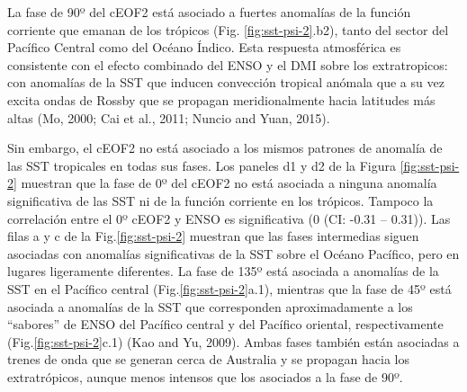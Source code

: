 \documentclass[12pt,oneside]{reedthesis}
\begin{document}
La fase de 90º del cEOF2 está asociado a fuertes anomalías de la función corriente que emanan de los trópicos (Fig. \ref{fig:sst-psi-2}.b2), tanto del sector del Pacífico Central como del Océano Índico.
Esta respuesta atmosférica es consistente con el efecto combinado del ENSO y el DMI sobre los extratropicos: con anomalías de la SST que inducen convección tropical anómala que a su vez excita ondas de Rossby que se propagan meridionalmente hacia latitudes más altas (Mo, 2000; Cai et al., 2011; Nuncio and Yuan, 2015).

Sin embargo, el cEOF2 no está asociado a los mismos patrones de anomalía de las SST tropicales en todas sus fases.
Los paneles d1 y d2 de la Figura \ref{fig:sst-psi-2} muestran que la fase de 0º del cEOF2 no está asociada a ninguna anomalía significativa de las SST ni de la función corriente en los trópicos.
Tampoco la correlación entre el 0º cEOF2 y ENSO es significativa (0 (CI: -0.31 -- 0.31)).
Las filas a y c de la Fig.\ref{fig:sst-psi-2} muestran que las fases intermedias siguen asociadas con anomalías significativas de la SST sobre el Océano Pacífico, pero en lugares ligeramente diferentes.
La fase de 135º está asociada a anomalías de la SST en el Pacífico central (Fig.\ref{fig:sst-psi-2}a.1), mientras que la fase de 45º está asociada a anomalías de la SST que corresponden aproximadamente a los ``sabores'' de ENSO del Pacífico central y del Pacífico oriental, respectivamente (Fig.\ref{fig:sst-psi-2}c.1) (Kao and Yu, 2009).
Ambas fases también están asociadas a trenes de onda que se generan cerca de Australia y se propagan hacia los extratrópicos, aunque menos intensos que los asociados a la fase de 90º.
\end{document}
